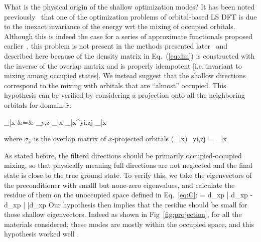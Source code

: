 \documentclass[aps,prl,twocolumn,reprint,amsmath,amssymb]{revtex4-1}
\begin{document}

\label{marker:nature} What is the physical origin of the shallow optimization modes? It has been noted previously~\cite{goedecker1999linear} that one of the optimization problems of orbital-based LS DFT is due to the inexact invariance of the energy wrt the mixing of occupied orbitals. Although this is indeed the case for a series of approximate functionals proposed earlier~, this problem is not present in the methods presented later~\cite{later} and described here because of the density matrix in Eq.~(\ref{eq:dm}) is constructed with the inverse of the overlap matrix and is properly idempotent [i.e. invariant to mixing among occupied states]. We instead suggest that the shallow directions correspond to the mixing with orbitals that are ``almost'' occupied. 
This hypothesis can be verified by considering a projection onto all the neighboring orbitals for domain $\bar{x}$:


\bea
_{\bar{x}} &=& \sum_{y,z} _{\bar{x}}  \sigma_{\bar{x}}^{yi,zj}  _{\bar{x}}
\label{eq:C}
\eea

where $\sigma_{\bar{x}}$ is the overlap matrix of $\bar{x}$-projected orbitals
\bea
\left(\sigma_{\bar{x}}\right)_{yi,zj} =  _{\bar{x}} 
\eea


As stated before, the filterd directions should be primarily occupied-occupied mixing, so that physically meaning full directions are not neglected and the final state is close to the true ground state. To verify this, we take the eigenvectors of the preconditioner with smalll but none-zero eigenvalues, and  calculate the residue of them on the unoccupied space defined in Eq.~\ref{eq:C}:
\bea
{} = \langle d_{xp} | d_{xp} \rangle - \langle d_{xp} |  |d_{xp} \rangle 
\label{eq:residue}
\eea
Our hypothesis then implies that the residue should be small for those shallow eigenvectors. Indeed as shown in Fig~\ref{fig:projection}, for all the materials considered, these modes are mostly within the occupied space, and this hypothesis worked well .
\end{document}
